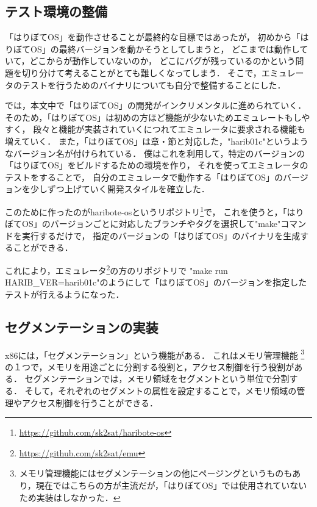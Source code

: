 \documentclass[10pt,a4j]{jsarticle}
\begin{document}
\subsection{テスト環境の整備\label{impl-test-env}}

「はりぼてOS」を動作させることが最終的な目標ではあったが，
初めから「はりぼてOS」の最終バージョンを動かそうとしてしまうと，
どこまでは動作していて，どこからが動作していないのか，
どこにバグが残っているのかという問題を切り分けて考えることがとても難しくなってしまう．
そこで，エミュレータのテストを行うためのバイナリについても自分で整備することにした．

\cite{30days-osdev}では，本文中で「はりぼてOS」の開発がインクリメンタルに進められていく．
そのため，「はりぼてOS」は初めの方ほど機能が少ないためエミュレートもしやすく，
段々と機能が実装されていくにつれてエミュレータに要求される機能も増えていく．
また，「はりぼてOS」は章・節と対応した，"harib01c"というようなバージョン名が付けられている．
僕はこれを利用して，特定のバージョンの「はりぼてOS」をビルドするための環境を作り，
それを使ってエミュレータのテストをすることで，
自分のエミュレータで動作する「はりぼてOS」のバージョンを少しずつ上げていく開発スタイルを確立した．

このために作ったのがharibote-osというリポジトリ\footnote{\url{https://github.com/sk2sat/haribote-os}}で，
これを使うと，「はりぼてOS」のバージョンごとに対応したブランチやタグを選択して"make"コマンドを実行するだけで，
指定のバージョンの「はりぼてOS」のバイナリを生成することができる．

これにより，エミュレータ\footnote{\url{https://github.com/sk2sat/emu}}の方のリポジトリで
"make run HARIB\_VER=harib01c"のようにして「はりぼてOS」のバージョンを指定したテストが行えるようになった．

\subsection{セグメンテーションの実装\label{impl-segmentation}}
x86には，「セグメンテーション」という機能がある．
これはメモリ管理機能
\footnote{メモリ管理機能にはセグメンテーションの他にページングというものもあり，現在ではこちらの方が主流だが，「はりぼてOS」では使用されていないため実装はしなかった．}
の１つで，メモリを用途ごとに分割する役割と，アクセス制御を行う役割がある．
セグメンテーションでは，メモリ領域をセグメントという単位で分割する．
そして，それぞれのセグメントの属性を設定することで，メモリ領域の管理やアクセス制御を行うことができる．
\end{document}
